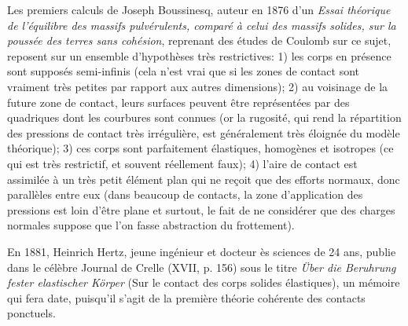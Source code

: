 \medskip
\begin{histoire}%
\ifVersionDuDocEstVincent{}\selectfont\fi
Les premiers calculs de Joseph Boussinesq, auteur en 1876 d'un \emph{Essai théorique de l'équilibre des massifs pulvérulents, comparé à celui des massifs solides, sur la poussée des terres sans cohésion}, reprenant des études de Coulomb sur ce sujet, reposent sur un ensemble d'hypothèses très restrictives:
1) les corps en présence sont supposés semi-infinis (cela n'est vrai que si les zones de contact sont vraiment très petites par rapport aux autres dimensions);
2) au voisinage de la future zone de contact, leurs surfaces peuvent être représentées par des quadriques dont les courbures sont connues (or la rugosité, qui rend la répartition des pressions de contact très irrégulière, est généralement très éloignée du modèle théorique);
3) ces corps sont parfaitement élastiques, homogènes et isotropes (ce qui est très restrictif, et souvent réellement faux);
4) l'aire de contact est assimilée à un très petit élément plan qui ne reçoit que des efforts normaux, donc parallèles entre eux (dans beaucoup de contacts, la zone d'application des pressions est loin d'être plane et surtout, le fait de ne considérer que des charges normales suppose que l'on fasse abstraction du frottement).

\medskip
En 1881, Heinrich Hertz, jeune ingénieur et docteur ès sciences de 24 ans, publie dans le célèbre Journal de Crelle (XVII, p. 156) sous le titre \emph{Über die Beruhrung fester elastischer Körper} (Sur le contact des corps solides élastiques), un mémoire qui fera date, puisqu'il s'agit de la première théorie cohérente des contacts ponctuels.


\end{histoire}
